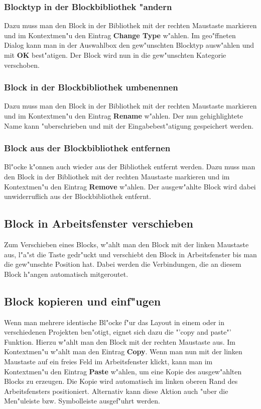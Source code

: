 \documentclass[a4paper,titlepage,12pt,ngerman]{scrbook}
\begin{document}
\subsubsection{Blocktyp in der Blockbibliothek "andern}
Dazu muss man den Block in der Bibliothek mit der rechten Maustaste markieren und im Kontextmen"u den Eintrag {\bf Change Type} w"ahlen. Im geo"ffneten Dialog kann man in der Auswahlbox den gew"unschten Blocktyp ausw"ahlen und mit {\bf OK} best"atigen. Der Block wird nun in die gew"unschten Kategorie verschoben.
\subsubsection{Block in der Blockbibliothek umbenennen}
Dazu muss man den Block in der Bibliothek mit der rechten Maustaste markieren und im Kontextmen"u den Eintrag {\bf Rename} w"ahlen. Der nun gehighlightete Name kann "uberschrieben und mit der Eingabebest"atigung gespeichert werden.
\subsubsection{Block aus der Blockbibliothek entfernen}
Bl"ocke k"onnen auch wieder aus der Bibliothek entfernt werden. Dazu muss man den
Block in der Bibliothek mit der rechten Maustaste markieren und im Kontextmen"u den
Eintrag {\bf Remove} w"ahlen. Der ausgew"ahlte Block wird dabei unwiderruflich aus der Blockbibliothek entfernt.

\subsection{Block in Arbeitsfenster verschieben}
Zum Verschieben eines Blocks, w"ahlt man den Block mit der linken Maustaste aus, l"a"st die Taste gedr"uckt und verschiebt den Block in Arbeitsfenster bis man die gew"unschte Position hat. Dabei werden die Verbindungen, die an diesem Block h"angen automatisch mitgeroutet.


\subsection{Block kopieren und einf"ugen}
Wenn man mehrere identische Bl"ocke f"ur das Layout in einem oder in verschiedenen Projekten ben"otigt, eignet sich dazu die "'copy and paste"' Funktion. Hierzu w"ahlt man den Block mit der rechten Maustaste aus. Im Kontextmen"u w"ahlt man den Eintrag {\bf Copy}. Wenn man nun mit der linken Maustaste auf ein freies Feld im Arbeitsfenster klickt, kann man im Kontextmen"u den Eintrag {\bf Paste} w"ahlen, um eine Kopie des ausgew"ahlten Blocks zu erzeugen.
Die Kopie wird automatisch im linken oberen Rand des Arbeitsfensters positioniert.\newline
Alternativ kann diese Aktion auch "uber die Men"uleiste bzw. Symbolleiste ausgef"uhrt werden.
\end{document}
